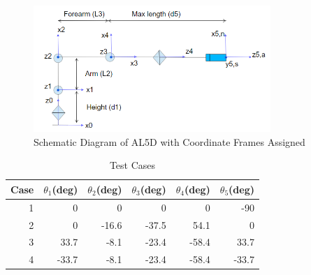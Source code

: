 \documentclass[12pt]{article}
\begin{document}
\begin{figure}[H]
    \centering
    \includegraphics[width=0.8\textwidth]{frames.png}
    \caption{Schematic Diagram of AL5D with Coordinate Frames Assigned}
    \label{fig:frames}
\end{figure}

\begin{table}[htbp]
  \centering
  \caption{Test Cases}
    \begin{tabular}{|r|rrrrr|}
    \hline
    \multicolumn{1}{|l|}{Case} & \multicolumn{1}{l}{$\theta_1$(deg)} & \multicolumn{1}{l}{$\theta_2$(deg)} & \multicolumn{1}{l}{$\theta_3$(deg)} & \multicolumn{1}{l}{$\theta_4$(deg)} & \multicolumn{1}{l|}{$\theta_5$(deg)} \\
    \hline
    1     & 0     & 0     & 0     & 0     & -90 \\
    2     & 0     & -16.6 & -37.5 & 54.1  & 0 \\
    3     & 33.7  & -8.1  & -23.4 & -58.4 & 33.7 \\
    4     & -33.7 & -8.1  & -23.4 & -58.4 & -33.7 \\
    \hline
    \end{tabular}%
  \label{tab:cases}%
\end{table}%
\pagebreak
\end{document}
